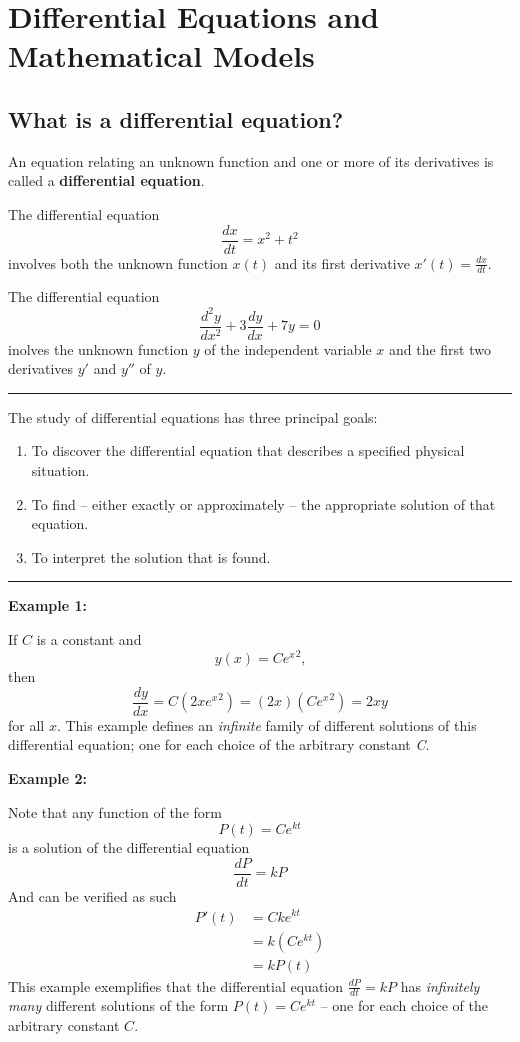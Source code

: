 \documentclass{article}
\begin{document}
\newpage
    \tableofcontents
\newpage

\section{Differential Equations and Mathematical Models}

\subsection{What is a differential equation?}

An equation relating an unknown function and one or more of its derivatives is called a \textbf{differential equation}.

The differential equation
$$ \frac{dx}{dt} = x^2 + t^2 $$
involves both the unknown function $ x(t) $ and its first derivative $ x'(t) = \frac{dx}{dt} $.

The differential equation
$$ \frac{d^2y}{dx^2} + 3\frac{dy}{dx} + 7y = 0 $$
inolves the unknown function $ y $ of the independent variable $ x $ and the first two derivatives $ y' $ and $ y'' $ of $ y $.

\par\noindent\rule{\textwidth}{0.4pt}

The study of differential equations has three principal goals:
\begin{enumerate}
    \item To discover the differential equation that describes a specified physical situation.
    \item To find – either exactly or approximately – the appropriate solution of that equation.
    \item To interpret the solution that is found.
\end{enumerate}

\par\noindent\rule{\textwidth}{0.4pt}

\textbf{Example 1:}

If $ C $ is a constant and
$$ y(x) = C{e^x}^{2}\text{,} $$
then
$$ \frac{dy}{dx} = C\left(2x{e^x}^{2}\right) = (2x)\left(C{e^x}^{2}\right) = 2xy $$
for all $ x $. This example defines an \textit{infinite} family of different solutions of this differential equation; one for each choice of the arbitrary constant \textit{C}.

\textbf{Example 2:}

Note that any function of the form
$$ P(t) = Ce^{kt} $$
is a solution of the differential equation
$$ \frac{dP}{dt} = kP $$
And can be verified as such
\begin{align*}
    P'(t) & = Cke^{kt} \\
          & = k\left(Ce^{kt}\right) \\
          & = kP(t)
\end{align*}
This example exemplifies that the differential equation $ \frac{dP}{dt} = kP $ has \textit{infinitely many} different solutions of the form $ P(t) = Ce^{kt} $ – one for each choice of the arbitrary constant $ C $.
\end{document}
